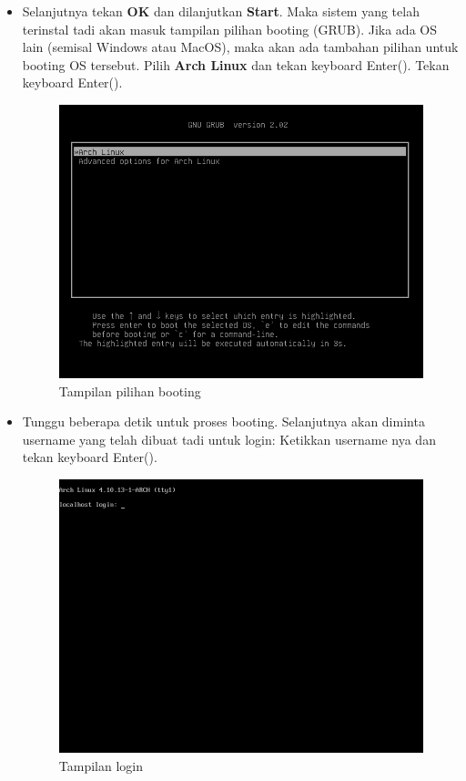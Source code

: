 \documentclass[12pt,]{article}
\begin{document}
\begin{itemize}
		\item Selanjutnya tekan \textbf{OK} dan dilanjutkan \textbf{Start}.
		Maka sistem yang telah terinstal tadi akan masuk tampilan pilihan booting (GRUB).
		Jika ada OS lain (semisal Windows atau MacOS), maka akan ada tambahan pilihan untuk booting OS tersebut.
		Pilih \textbf{Arch Linux} dan tekan keyboard Enter(\keys{\return}).
		Tekan keyboard Enter(\keys{\return}).
		\begin{figure}[H]
			\centering
			\includegraphics[width=0.6\linewidth]{images/vbox_afterinstall/s3}
			\caption{Tampilan pilihan booting}
		\end{figure}

		\item Tunggu beberapa detik untuk proses booting.
		Selanjutnya akan diminta username yang telah dibuat tadi untuk login:
		Ketikkan username nya dan tekan keyboard Enter(\keys{\return}).
		\begin{figure}[H]
			\centering
			\includegraphics[width=0.6\linewidth]{images/vbox_afterinstall/s4}
			\caption{Tampilan login}
		\end{figure}


\end{itemize}
\end{document}
